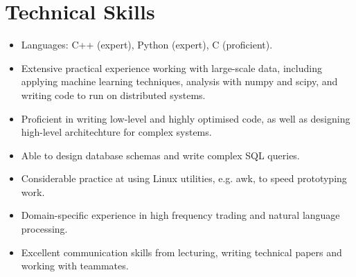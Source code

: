 \documentclass[]{article}
\begin{document}
\section*{Technical Skills}

\begin{itemize}%
\item {Languages: C++ (expert), Python (expert), C (proficient).}
\item {Extensive practical experience working with large-scale data, including applying machine learning techniques,
	analysis with numpy and scipy, and writing code to run on distributed systems.}
\item {Proficient in writing low-level and highly optimised code, as well as designing high-level architechture for complex systems.}
\item {Able to design database schemas and write complex SQL queries.} 
\item {Considerable practice at using Linux utilities, e.g. awk, to speed prototyping work.}
\item {Domain-specific experience in high frequency trading and natural language processing.}
\item {Excellent communication skills from lecturing, writing technical papers and working with teammates.}
\end{itemize}
\end{document}
